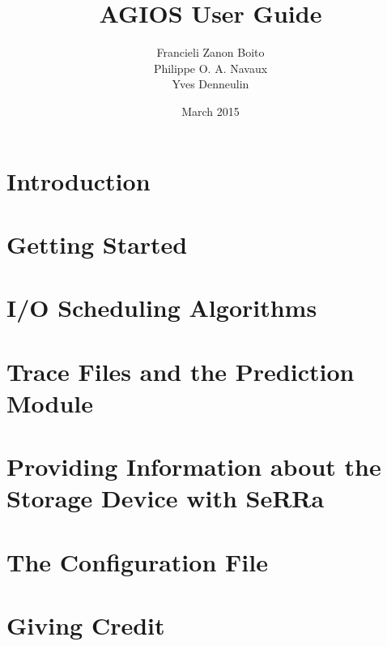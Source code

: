\documentclass[10pt]{report}
\begin{document}
%
\title{AGIOS User Guide}


\author{
Francieli Zanon Boito\\Philippe O. A. Navaux\\Yves Denneulin}

\date{March 2015}

\maketitle

\tableofcontents


\chapter{Introduction}



\chapter{Getting Started} \label{chapter:starting}



\chapter{I/O Scheduling Algorithms} \label{chapter:algorithms}



\chapter{Trace Files and the Prediction Module} \label{chapter:trace}



\chapter{Providing Information about the Storage Device with SeRRa} \label{chapter:serra}



\chapter{The Configuration File} \label{chapter:configfile}



\chapter{Giving Credit} \label{chapter:citing}




\balance
%
%

\end{document}
